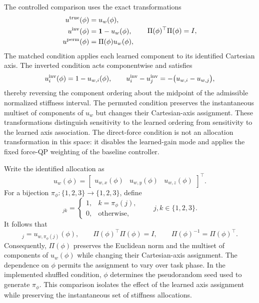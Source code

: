 \documentclass[11pt,a4paper]{article}
\begin{document}
The controlled comparison uses the exact transformations
\begin{equation}
\begin{aligned}
u^{\rm true}(\phi)&=u_w(\phi),\\
u^{\rm inv}(\phi)&=\mathbf 1-u_w(\phi),\\
u^{\rm perm}(\phi)&=\Pi(\phi)u_w(\phi),
\end{aligned}
\qquad
\Pi(\phi)^\top\Pi(\phi)=I ,
\label{eq:variance_assignments}
\end{equation}
The matched condition applies each learned component to its identified
Cartesian axis. The inverted condition acts componentwise and satisfies
\begin{equation}
u_i^{\rm inv}(\phi)=1-u_{w,i}(\phi),
\qquad
u_i^{\rm inv}-u_j^{\rm inv}
=-\big(u_{w,i}-u_{w,j}\big),
\label{eq:inverted_allocation_order}
\end{equation}
thereby reversing the component ordering about the midpoint of the admissible
normalized stiffness interval. The permuted condition preserves the
instantaneous multiset of components of $u_w$ but changes their Cartesian-axis
assignment. These transformations distinguish sensitivity to the learned
ordering from sensitivity to the learned axis association. The direct-force
condition is not an allocation transformation in this space: it disables the
learned-gain mode and applies the fixed force-QP weighting of the baseline
controller.

Write the identified allocation as
\begin{equation}
u_w(\phi)
=
\begin{bmatrix}
u_{w,x}(\phi)&u_{w,y}(\phi)&u_{w,z}(\phi)
\end{bmatrix}^{\top}.
\label{eq:allocation_axis_vector}
\end{equation}
For a bijection $\pi_\phi:\{1,2,3\}\rightarrow\{1,2,3\}$, define
\begin{equation}
[\Pi(\phi)]_{jk}
=
\begin{cases}
1,&k=\pi_\phi(j),\\
0,&\text{otherwise},
\end{cases}
\qquad j,k\in\{1,2,3\}.
\label{eq:permutation_definition}
\end{equation}
It follows that
\begin{equation}
[\Pi(\phi)u_w(\phi)]_j
=u_{w,\pi_\phi(j)}(\phi),
\qquad
\Pi(\phi)^\top\Pi(\phi)=I,
\qquad
\Pi(\phi)^{-1}=\Pi(\phi)^\top .
\label{eq:permutation_properties}
\end{equation}
Consequently, $\Pi(\phi)$ preserves the Euclidean norm and the multiset of
components of $u_w(\phi)$ while changing their Cartesian-axis assignment.
The dependence on $\phi$ permits the assignment to vary over task phase. In
the implemented shuffled condition, $\phi$ determines the pseudorandom seed
used to generate $\pi_\phi$. This comparison isolates the effect of the
learned axis assignment while preserving the instantaneous set of stiffness
allocations.
\end{document}
